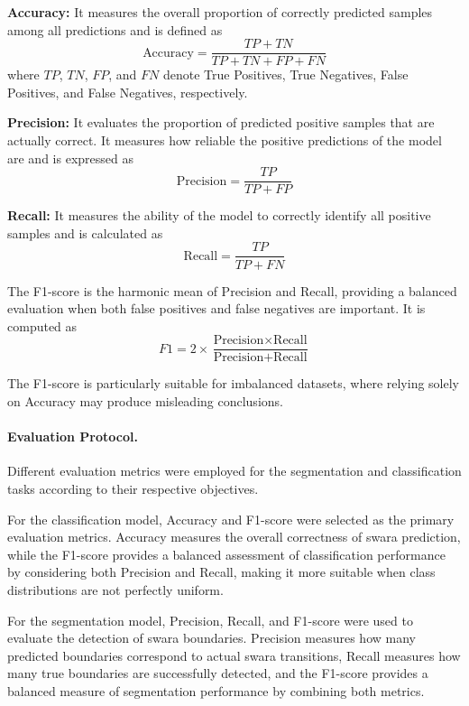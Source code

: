 \textbf{Accuracy:} It measures the overall proportion of correctly predicted samples among all predictions and is defined as
\begin{equation}
\text{Accuracy} = \frac{TP + TN}{TP + TN + FP + FN}
\end{equation}
where $TP$, $TN$, $FP$, and $FN$ denote True Positives, True Negatives, False Positives, and False Negatives, respectively.

\textbf{Precision:} It evaluates the proportion of predicted positive samples that are actually correct. It measures how reliable the positive predictions of the model are and is expressed as
\begin{equation}
\text{Precision} = \frac{TP}{TP + FP}
\end{equation}

\textbf{Recall:} It measures the ability of the model to correctly identify all positive samples and is calculated as
\begin{equation}
\text{Recall} = \frac{TP}{TP + FN}
\end{equation}

The F1-score is the harmonic mean of Precision and Recall, providing a balanced evaluation when both false positives and false negatives are important. It is computed as
\begin{equation}
F1 = 2 \times \frac{\text{Precision} \times \text{Recall}}{\text{Precision} + \text{Recall}}
\end{equation}

The F1-score is particularly suitable for imbalanced datasets, where relying solely on Accuracy may produce misleading conclusions.

\paragraph{Evaluation Protocol.} Different evaluation metrics were employed for the segmentation and classification tasks according to their respective objectives.

For the classification model, Accuracy and F1-score were selected as the primary evaluation metrics. Accuracy measures the overall correctness of swara prediction, while the F1-score provides a balanced assessment of classification performance by considering both Precision and Recall, making it more suitable when class distributions are not perfectly uniform.

For the segmentation model, Precision, Recall, and F1-score were used to evaluate the detection of swara boundaries. Precision measures how many predicted boundaries correspond to actual swara transitions, Recall measures how many true boundaries are successfully detected, and the F1-score provides a balanced measure of segmentation performance by combining both metrics.
